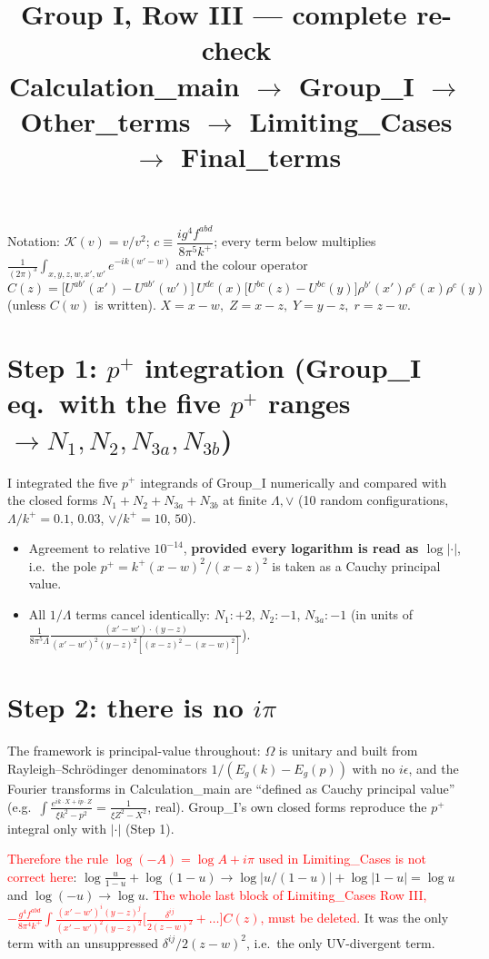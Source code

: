 \documentclass[10pt]{article}
\title{Group I, Row III --- complete re-check\\
\small Calculation\_main $\to$ Group\_I $\to$ Other\_terms $\to$ Limiting\_Cases $\to$ Final\_terms}
\date{}
\def\K{\mathcal{K}}
\begin{document}
\maketitle
\noindent Notation: $\K(v)=v/v^{2}$; $c\equiv \dfrac{ig^{4}f^{abd}}{8\pi^{5}k^{+}}$; every term below multiplies
$\frac{1}{(2\pi)^{3}}\int_{x,y,z,w,x',w'}e^{-ik(w'-w)}$ and the colour operator
\[
C(z)=\big[U^{ab'}(x')-U^{ab'}(w')\big]\,U^{de}(x)\big[U^{bc}(z)-U^{bc}(y)\big]\rho^{b'}(x')\rho^{e}(x)\rho^{c}(y)
\]
(unless $C(w)$ is written). $X=x-w,\;Z=x-z,\;Y=y-z,\;r=z-w$.

\section{Step 1: $p^{+}$ integration (Group\_I eq.\ with the five $p^{+}$ ranges $\to N_1,N_2,N_{3a},N_{3b}$)}
I integrated the five $p^{+}$ integrands of Group\_I numerically and compared with the closed forms
$N_1+N_2+N_{3a}+N_{3b}$ at finite $\Lambda,\vee$ (10 random configurations, $\Lambda/k^+=0.1,\,0.03$, $\vee/k^+=10,\,50$).
\begin{itemize}
\item Agreement to relative $10^{-14}$, \textbf{provided every logarithm is read as $\log|\cdot|$}, i.e.\ the pole
$p^{+}=k^{+}(x-w)^{2}/(x-z)^{2}$ is taken as a Cauchy principal value.
\item All $1/\Lambda$ terms cancel identically: $N_1:+2$, $N_2:-1$, $N_{3a}:-1$ (in units of
$\frac{1}{8\pi^5\Lambda}\frac{(x'-w')\cdot(y-z)}{(x'-w')^2(y-z)^2[(x-z)^2-(x-w)^2]}$).
\end{itemize}

\section{Step 2: there is no $i\pi$}
The framework is principal-value throughout: $\Omega$ is unitary and built from Rayleigh--Schr\"odinger denominators
$1/(E_g(k)-E_g(p))$ with no $i\epsilon$, and the Fourier transforms in Calculation\_main are ``defined as Cauchy principal value''
(e.g.\ $\int\frac{e^{ik\cdot X+ip\cdot Z}}{\xi k^2-p^2}=\frac{1}{\xi Z^2-X^2}$, real).
Group\_I's own closed forms reproduce the $p^{+}$ integral only with $|\cdot|$ (Step 1).

\medskip
\noindent\textcolor{red}{Therefore the rule $\log(-A)=\log A+i\pi$ used in Limiting\_Cases is not correct here}: $\log\frac{u}{1-u}+\log(1-u)\to\log|u/(1-u)|+\log|1-u|=\log u$ and
$\log(-u)\to\log u$. \textcolor{red}{The whole last block of Limiting\_Cases Row III,
$-\frac{g^4f^{abd}}{8\pi^4k^+}\int\frac{(x'-w')^i(y-z)^j}{(x'-w')^2(y-z)^2}\big[\frac{\delta^{ij}}{2(z-w)^2}+\dots\big]C(z)$, must be deleted.}
It was the only term with an unsuppressed $\delta^{ij}/2(z-w)^2$, i.e.\ the only UV-divergent term.
\end{document}
